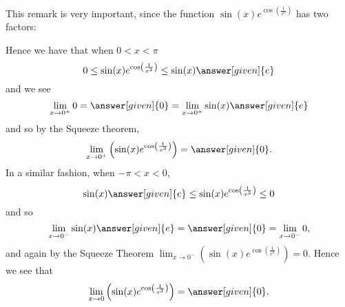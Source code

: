 \documentclass{ximera}
\begin{document}
\begin{example}
\begin{explanation}
  This remark is very important, since the function $\sin(x) e^{\cos\left(\frac{1}{x^3}\right)}$ has two factors:
    \begin{image}
    \end{image}
    Hence we have that when $0< x<\pi$
    \[
   0 \le \sin(x) e^{\cos\left(\frac{1}{x^3}\right)} \le \sin(x) \answer[given]{e}
    \]
    and we see
    \[
    \lim_{x\to 0^+}0 = \answer[given]{0} = \lim_{x\to 0^+} \sin(x) \answer[given]{e}
    \]
    and so by the Squeeze theorem,
    \[
    \lim_{x\to
      0^+}\left(\sin(x)e^{\cos\left(\frac{1}{x^3}\right)}\right)=\answer[given]{0}.
    \]
    In a similar fashion, when $-\pi<x<0$,
    \[
    \sin(x) \answer[given]{e} \le \sin(x) e^{\cos\left(\frac{1}{x^3}\right)} \le 0
    \]
    and so
    \[
    \lim_{x\to 0^-}\sin(x) \answer[given]{e} =\answer[given]{0}=\lim_{x\to 0^-}0,
    \]
    and again by the Squeeze Theorem $\lim_{x\to 0^-}\left(\sin(x)
    e^{\cos\left(\frac{1}{x^3}\right)}\right)=0$. Hence we see that
    \[
    \lim_{x\to 0}\left(\sin(x)
    e^{\cos\left(\frac{1}{x^3}\right)}\right)=\answer[given]{0}.
    \]




\end{explanation}
\end{example}
\end{document}
